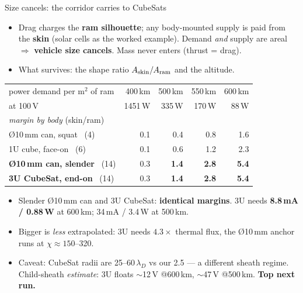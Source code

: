 \documentclass[10pt,aspectratio=169]{beamer}
\begin{document}
\begin{frame}{Size cancels: the corridor carries to CubeSats}
  \begin{itemize}\small
    \item Drag charges the \textbf{ram silhouette}; any body-mounted supply
          is paid from the \textbf{skin} (solar cells as the worked example).
          Demand \emph{and} supply are areal $\Rightarrow$
          \textbf{vehicle size cancels}. Mass never enters (thrust = drag).
    \item What survives: the shape ratio $A_{\rm skin}/A_{\rm ram}$ and the
          altitude.
  \end{itemize}
  \vspace{0.5em}
  \centering\scriptsize
  \begin{tabular}{lrrrr}
    \hline
    power demand per m$^2$ of ram & 400\,km & 500\,km & 550\,km & 600\,km\\
    at 100\,V & 1451\,W & 335\,W & 170\,W & 88\,W\\
    \hline
    \emph{margin by body} (skin/ram) & & & &\\
    \O10\,mm can, squat \ (4) & 0.1 & 0.4 & 0.8 & 1.6\\
    1U cube, face-on \ (6) & 0.1 & 0.6 & 1.2 & 2.3\\
    \textbf{\O10\,mm can, slender} \ (14) & 0.3 & \textbf{1.4} & \textbf{2.8} & \textbf{5.4}\\
    \textbf{3U CubeSat, end-on} \ (14) & 0.3 & \textbf{1.4} & \textbf{2.8} & \textbf{5.4}\\
    \hline
  \end{tabular}
  \vspace{0.4em}
  \begin{itemize}\scriptsize
    \item Slender \O10\,mm can and 3U CubeSat: \textbf{identical margins}.
          3U needs \textbf{8.8\,mA / 0.88\,W} at 600\,km; 34\,mA / 3.4\,W at 500\,km.
    \item Bigger is \emph{less} extrapolated: 3U needs $4.3\times$ thermal flux,
          the \O10\,mm anchor runs at $\chi \approx 150$--320.
    \item Caveat: CubeSat radii are 25--60\,$\lambda_D$ vs our 2.5 --- a
          different sheath regime. Child-sheath \emph{estimate}: 3U floats
          $\sim$12\,V @600\,km, $\sim$47\,V @500\,km. \textbf{Top next run.}
  \end{itemize}
\end{frame}
\end{document}
